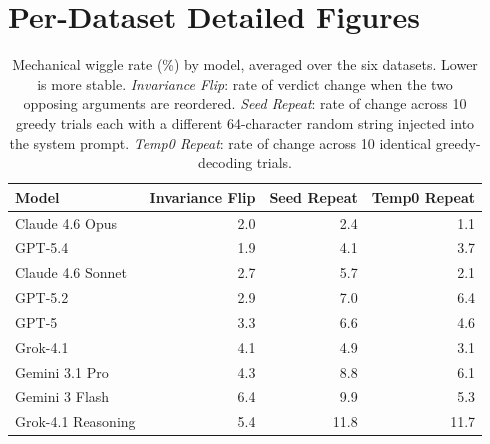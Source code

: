 
\section{Per-Dataset Detailed Figures}
\label{sec:appendix-perdomain}


\begin{table}[h]
\centering
\small
\caption{Mechanical wiggle rate (\%) by model, averaged over the six datasets. Lower is more stable. \emph{Invariance Flip}: rate of verdict change when the two opposing arguments are reordered. \emph{Seed Repeat}: rate of change across 10 greedy trials each with a different 64-character random string injected into the system prompt. \emph{Temp0 Repeat}: rate of change across 10 identical greedy-decoding trials.}
\label{tab:mech-variation}
\begin{tabular}{@{}lrrr@{}}
\toprule
\textbf{Model} & \textbf{Invariance Flip} & \textbf{Seed Repeat} & \textbf{Temp0 Repeat} \\
\midrule
Claude 4.6 Opus    & 2.0 &  2.4 &  1.1 \\
GPT-5.4            & 1.9 &  4.1 &  3.7 \\
Claude 4.6 Sonnet  & 2.7 &  5.7 &  2.1 \\
GPT-5.2            & 2.9 &  7.0 &  6.4 \\
GPT-5              & 3.3 &  6.6 &  4.6 \\
Grok-4.1           & 4.1 &  4.9 &  3.1 \\
Gemini 3.1 Pro     & 4.3 &  8.8 &  6.1 \\
Gemini 3 Flash     & 6.4 &  9.9 &  5.3 \\
Grok-4.1 Reasoning & 5.4 & 11.8 & 11.7 \\
\bottomrule
\end{tabular}
\end{table}

